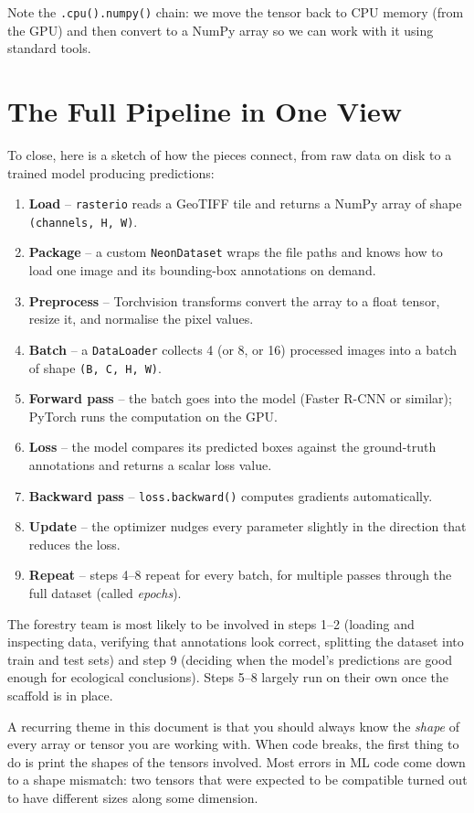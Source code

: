 \documentclass[11pt, a4paper]{article}
\newenvironment{note}{%
  \begin{tcolorbox}[
    colback=notebg, colframe=noteframe,
    fonttitle=\bfseries, title=Note,
    breakable, enhanced
  ]
}{%
  \end{tcolorbox}
}
\begin{document}
Note the \lstinline{.cpu().numpy()} chain: we move the tensor back to CPU
memory (from the GPU) and then convert to a NumPy array so we can work with it
using standard tools.

\section{The Full Pipeline in One View}

To close, here is a sketch of how the pieces connect, from raw data on disk to
a trained model producing predictions:

\begin{enumerate}
  \item \textbf{Load} -- \lstinline{rasterio} reads a GeoTIFF tile and returns
        a NumPy array of shape \lstinline{(channels, H, W)}.
  \item \textbf{Package} -- a custom \lstinline{NeonDataset} wraps the file
        paths and knows how to load one image and its bounding-box annotations
        on demand.
  \item \textbf{Preprocess} -- Torchvision transforms convert the array to a
        float tensor, resize it, and normalise the pixel values.
  \item \textbf{Batch} -- a \lstinline{DataLoader} collects 4 (or 8, or 16)
        processed images into a batch of shape \lstinline{(B, C, H, W)}.
  \item \textbf{Forward pass} -- the batch goes into the model (Faster R-CNN
        or similar); PyTorch runs the computation on the GPU.
  \item \textbf{Loss} -- the model compares its predicted boxes against the
        ground-truth annotations and returns a scalar loss value.
  \item \textbf{Backward pass} -- \lstinline{loss.backward()} computes
        gradients automatically.
  \item \textbf{Update} -- the optimizer nudges every parameter slightly in the
        direction that reduces the loss.
  \item \textbf{Repeat} -- steps 4--8 repeat for every batch, for multiple
        passes through the full dataset (called \emph{epochs}).
\end{enumerate}

The forestry team is most likely to be involved in steps 1--2 (loading and
inspecting data, verifying that annotations look correct, splitting the dataset
into train and test sets) and step 9 (deciding when the model's predictions
are good enough for ecological conclusions). Steps 5--8 largely run on their
own once the scaffold is in place.

\begin{note}
  A recurring theme in this document is that you should always know the
  \emph{shape} of every array or tensor you are working with. When code
  breaks, the first thing to do is print the shapes of the tensors involved.
  Most errors in ML code come down to a shape mismatch: two tensors that were
  expected to be compatible turned out to have different sizes along some
  dimension.
\end{note}
\end{document}
